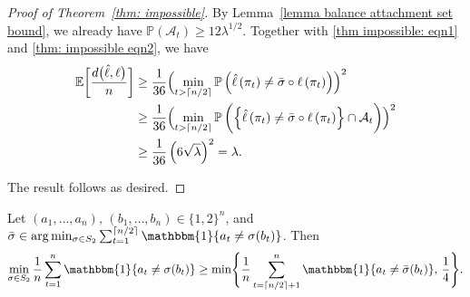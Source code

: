 \documentclass[twoside,11pt]{article}
\theoremstyle{remark}
\begin{document}
\begin{proof}[Proof of Theorem~\ref{thm: impossible}]
By Lemma~\ref{lemma balance attachment set bound}, we already have $\mathbb{P}\left( \mathcal{A}_t\right)\geq 12\lambda^{1/2}$.
Together with \eqref{thm impossible: eqn1} and \eqref{thm: impossible eqn2}, we have
%
\begin{equation*}
\begin{aligned}
\mathbb{E}\biggl[\frac{d\bigl(\hat{\ell},\ell\bigr)}{n}\biggr]&\geq
\frac{1}{36}
\Bigl(\min_{t > \lceil n/2 \rceil}\mathbb{P}\left(\hat{\ell}\left(\pi_{t}\right)\neq \bar{\sigma}\circ \ell\left(\pi_{t}\right)\right)\Bigr)^2\\
&\geq \frac{1}{36}
\Bigl(\min_{t > \lceil n/2 \rceil}\mathbb{P}\left(\left\{\hat{\ell}\left(\pi_{t}\right)\neq \bar{\sigma}\circ \ell\left(\pi_{t}\right)\right\}\cap \mathcal{A}_t\right)\Bigr)^2\\
&\geq \frac{1}{36}\left(6\sqrt{\lambda}\right)^2=\lambda.
\end{aligned}
\end{equation*}
%



The result follows as desired.
\end{proof}

\begin{lemma}
\label{lemma: split alignment}
Let $(a_1,\ldots,a_n),\, (b_1,\ldots,b_n)\in\{1,2\}^n$, and $\bar{\sigma}
\in
\arg\min_{\sigma\in S_2}
\sum_{t=1}^{\lceil n/2\rceil}
\mathbbm{1}\{a_t\neq\sigma(b_t)\}$.
Then
%
\begin{equation*}
\min_{\sigma\in S_2}
\frac1n
\sum_{t=1}^n
\mathbbm{1}\{a_t\neq\sigma(b_t)\}
\ge
\min\Biggl\{
\frac1n
\sum_{t=\lceil n/2\rceil+1}^{n}
\mathbbm{1}\{a_t\neq\bar{\sigma}(b_t)\},
\,
\frac14
\Biggr\}.    
\end{equation*}
%
\end{lemma}
\end{document}
